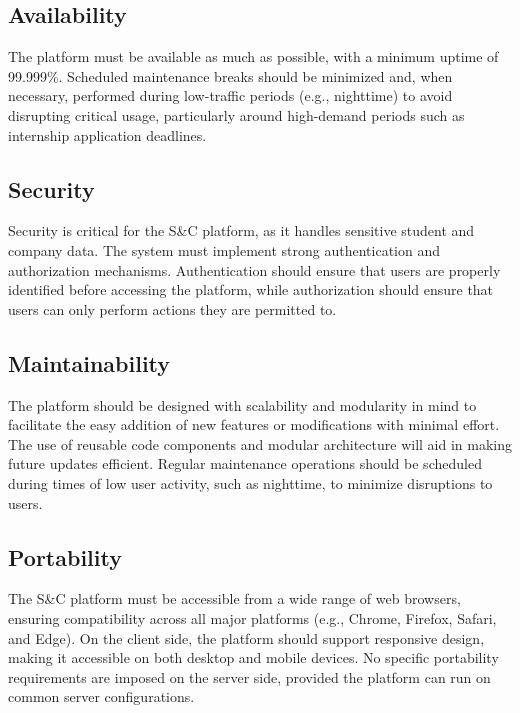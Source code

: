 \subsection{Availability}
The platform must be available as much as possible, with a minimum uptime of 99.999\%. Scheduled maintenance breaks should be minimized and, when necessary, performed during low-traffic periods (e.g., nighttime) to avoid disrupting critical usage, particularly around high-demand periods such as internship application deadlines.

\subsection{Security}
Security is critical for the S\&C platform, as it handles sensitive student and company data. The system must implement strong authentication and authorization mechanisms. Authentication should ensure that users are properly identified before accessing the platform, while authorization should ensure that users can only perform actions they are permitted to.

\subsection{Maintainability}
The platform should be designed with scalability and modularity in mind to facilitate the easy addition of new features or modifications with minimal effort. The use of reusable code components and modular architecture will aid in making future updates efficient. Regular maintenance operations should be scheduled during times of low user activity, such as nighttime, to minimize disruptions to users.

\subsection{Portability}
The S\&C platform must be accessible from a wide range of web browsers, ensuring compatibility across all major platforms (e.g., Chrome, Firefox, Safari, and Edge). On the client side, the platform should support responsive design, making it accessible on both desktop and mobile devices. No specific portability requirements are imposed on the server side, provided the platform can run on common server configurations.


\newpage

